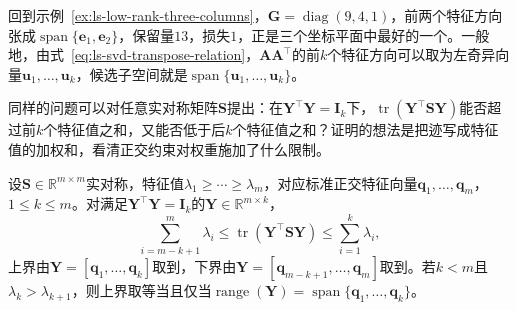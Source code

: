回到示例~\ref{ex:ls-low-rank-three-columns}，$\bm G=\operatorname{diag}(9,4,1)$，前两个特征方向张成$\operatorname{span}\{\bm e_1,\bm e_2\}$，保留量$13$，损失$1$，正是三个坐标平面中最好的一个。一般地，由式~\eqref{eq:ls-svd-transpose-relation}，$\bm A\bm A^\top$的前$k$个特征方向可以取为左奇异向量$\bm u_1,\ldots,\bm u_k$，候选子空间就是$\operatorname{span}\{\bm u_1,\ldots,\bm u_k\}$。

同样的问题可以对任意实对称矩阵$\bm S$提出：在$\bm Y^\top\bm Y=\bm I_k$下，$\operatorname{tr}(\bm Y^\top\bm S\bm Y)$能否超过前$k$个特征值之和，又能否低于后$k$个特征值之和？证明的想法是把迹写成特征值的加权和，看清正交约束对权重施加了什么限制。

\begin{theorem}[迹极值]
\label{thm:matrix-analysis-trace-minimum}
设$\bm S\in\mathbb R^{m\times m}$实对称，特征值$\lambda_1\geq\cdots\geq\lambda_m$，对应标准正交特征向量$\bm q_1,\ldots,\bm q_m$，$1\leq k\leq m$。对满足$\bm Y^\top\bm Y=\bm I_k$的$\bm Y\in\mathbb R^{m\times k}$，
\begin{equation}
 \sum_{i=m-k+1}^{m}\lambda_i\leq\operatorname{tr}(\bm Y^\top\bm S\bm Y)\leq\sum_{i=1}^{k}\lambda_i,
 \label{eq:matrix-analysis-trace-minimum}
\end{equation}
上界由$\bm Y=[\bm q_1,\ldots,\bm q_k]$取到，下界由$\bm Y=[\bm q_{m-k+1},\ldots,\bm q_m]$取到。若$k<m$且$\lambda_k>\lambda_{k+1}$，则上界取等当且仅当$\operatorname{range}(\bm Y)=\operatorname{span}\{\bm q_1,\ldots,\bm q_k\}$。
\end{theorem}

